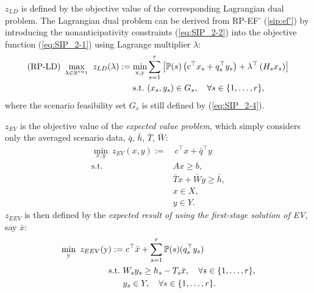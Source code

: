 $z_{LD}$ is defined by the objective value of the corresponding Lagrangian dual problem. The Lagrangian dual problem can be derived from RP-EF' (\ref{sip:ef'}) by introducing the nonanticipativity constraints (\ref{eq:SIP_2-2}) into the objective function (\ref{eq:SIP_2-1}) using Lagrange multiplier $\lambda$:
\begin{subequations}\label{ld}
	\begin{align}
	\textrm{(RP-LD) }\max_{\lambda\in\mathbb{R}^{rn_1}}\ z_{LD}(\lambda) :=\min_{\mathrm{x},\mathrm{y}}  &\sum_{s=1}^{r}\left[\operatorname*{\mathbb{P}}(s)\left(c^{\top}x_s+q_s^{\top}y_s\right)+\lambda^\top \left(H_s x_s\right)\right] \label{ld:obj}\\ 
	\mathrm{s.t.}\ & (x_s,y_s)\in G_s,\quad \forall s\in\{1,\ldots,r\},	 \label{ld:b}
	\end{align}
\end{subequations}
where the scenario feasibility set $G_s$ is still defined by (\ref{eq:SIP_2-4}).

$z_{EV}$ is the objective value of the \textit{expected value problem}, which simply considers only the averaged scenario data, $\bar{q}$, $\bar{h}$, $\bar{T}$, $\bar{W}$:
\begin{subequations}\label{ev}
	\begin{align}
	\min_{x,y}\ z_{EV}(x,y):=&\ c^{\top}x + \bar{q}^{\top}y \label{ev:obj}\\ 
	\mathrm{s.t.}\ &Ax\ge b,  \label{ev:b}\\
	&\bar{T} x+\bar{W} y\ge \bar{h},  \label{ev:c}\\
	&x\in X,  \label{ev:d}\\
	&y \in Y. \label{ev:e}
	\end{align}
\end{subequations}
$z_{EEV}$ is then defined by the \textit{expected result of using the first-stage solution of EV}, say $\bar{x}$: 
\begin{subequations}\label{eev}
	\begin{align}
	\min_{\mathrm{y}}\ z_{EEV}(\mathrm{y}):=&\ c^{\top}\bar{x} + \sum_{s=1}^{r}\operatorname*{\mathbb{P}}(s) (q_s^{\top}y_s) \label{eev:obj}\\ 
	\mathrm{s.t.}\ &W_s y_s\ge h_s-T_s \bar{x},\quad\forall s\in\{1,\ldots,r\}, \label{eev:b}\\
	&y_s \in Y,\quad\forall s\in\{1,\ldots,r\}. \label{eev:c}
	\end{align}
\end{subequations}

